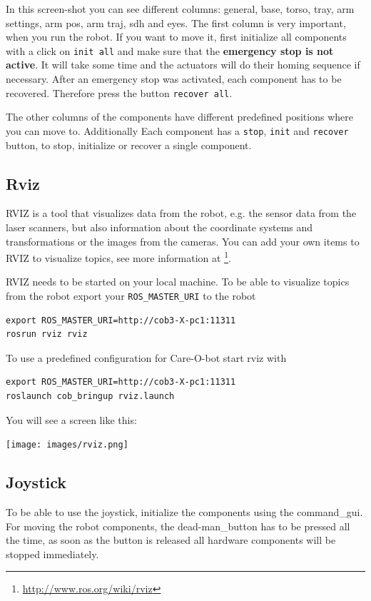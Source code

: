 In this screen-shot you can see different columns: general, base, torso, tray, arm settings, arm pos, arm traj, sdh and eyes. The first column is very important, when you run the robot. If you want to move it, first initialize all components with a click on \texttt{init all} and make sure that the \textbf{emergency stop is not active}. It will take some time and the actuators will do their homing sequence if necessary. After an emergency stop was activated, each component has to be recovered. Therefore press the button \texttt{recover all}. 

The other columns of the components have different predefined positions where you can move to. Additionally Each component has a \texttt{stop}, \texttt{init} and \texttt{recover} button, to stop, initialize or recover a single component.

\subsection{Rviz}\label{subsec:rviz}
RVIZ is a tool that visualizes data from the robot, e.g. the sensor data from the laser scanners, but also information about the coordinate systems and transformations or the images from the cameras. You can add your own items to RVIZ to visualize topics, see more information at \footnote{\url{http://www.ros.org/wiki/rviz}}.

RVIZ needs to be started on your local machine. To be able to visualize topics from the robot export your \texttt{ROS\_MASTER\_URI} to the robot
\begin{lstlisting}
export ROS_MASTER_URI=http://cob3-X-pc1:11311
rosrun rviz rviz
\end{lstlisting}

To use a predefined configuration for Care-O-bot start rviz with
\begin{lstlisting}
export ROS_MASTER_URI=http://cob3-X-pc1:11311
roslaunch cob_bringup rviz.launch
\end{lstlisting}

You will see a screen like this:
\begin {center}
\texttt{[image: images/rviz.png]}
\end{center}

\subsection{Joystick}\label{subsec:joystick}
To be able to use the joystick, initialize the components using the command\_gui. For moving the robot components, the dead-man\_button has to be pressed all the time, as soon as the button is released all hardware components will be stopped immediately. 

